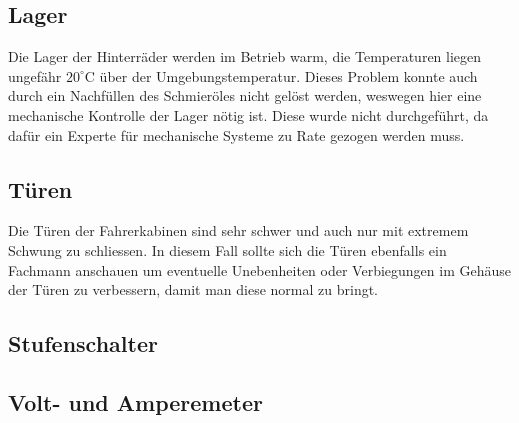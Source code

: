 \subsection{Lager}
Die Lager der Hinterräder werden im Betrieb warm, die Temperaturen liegen ungefähr $20^\circ$C über der Umgebungstemperatur. Dieses Problem konnte auch durch ein Nachfüllen des Schmieröles nicht gelöst werden, weswegen hier eine mechanische Kontrolle der Lager nötig ist. Diese wurde nicht durchgeführt, da dafür ein Experte für mechanische Systeme zu Rate gezogen werden muss.

\subsection{Türen}
Die Türen der Fahrerkabinen sind sehr schwer und auch nur mit extremem Schwung zu schliessen. In diesem Fall sollte sich die Türen ebenfalls ein Fachmann anschauen um eventuelle Unebenheiten oder Verbiegungen im Gehäuse der Türen zu verbessern, damit man diese normal zu bringt.

\subsection{Stufenschalter}

\subsection{Volt- und Amperemeter}

\color{black}
